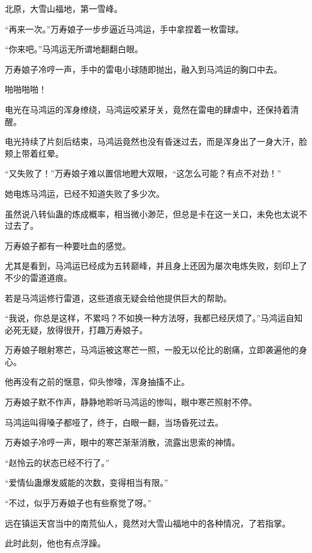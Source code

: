 
\begin{this_body}



北原，大雪山福地，第一雪峰。

“再来一次。”万寿娘子一步步逼近马鸿运，手中拿捏着一枚雷球。

“你来吧。”马鸿运无所谓地翻翻白眼。

万寿娘子冷哼一声，手中的雷电小球随即抛出，融入到马鸿运的胸口中去。

啪啪啪啪！

电光在马鸿运的浑身缭绕，马鸿运咬紧牙关，竟然在雷电的肆虐中，还保持着清醒。

电光持续了片刻后结束，马鸿运竟然也没有昏迷过去，而是浑身出了一身大汗，脸颊上带着红晕。

“又失败了！”万寿娘子难以置信地瞪大双眼，“这怎么可能？有点不对劲！”

她电炼马鸿运，已经不知道失败了多少次。

虽然说八转仙蛊的炼成概率，相当微小渺茫，但总是卡在这一关口，未免也太说不过去了。

万寿娘子都有一种要吐血的感觉。

尤其是看到，马鸿运已经成为五转巅峰，并且身上还因为屡次电炼失败，刻印上了不少的雷道道痕。

若是马鸿运修行雷道，这些道痕无疑会给他提供巨大的帮助。

“我说，你总是这样，不累吗？不如换一种方法呀，我都已经厌烦了。”马鸿运自知必死无疑，放得很开，打趣万寿娘子。

万寿娘子眼射寒芒，马鸿运被这寒芒一照，一股无以伦比的剧痛，立即袭遍他的身心。

他再没有之前的惬意，仰头惨嚎，浑身抽搐不止。

万寿娘子默不作声，静静地聆听马鸿运的惨叫，眼中寒芒照射不停。

马鸿运叫得嗓子都哑了，终于，白眼一翻，当场昏死过去。

万寿娘子冷哼一声，眼中的寒芒渐渐消散，流露出思索的神情。

“赵怜云的状态已经不行了。”

“爱情仙蛊爆发威能的次数，变得相当有限。”

“不过，似乎万寿娘子也有些察觉了呀。”

远在镇运天宫当中的南荒仙人，竟然对大雪山福地中的各种情况，了若指掌。

此时此刻，他也有点浮躁。


\end{this_body}
